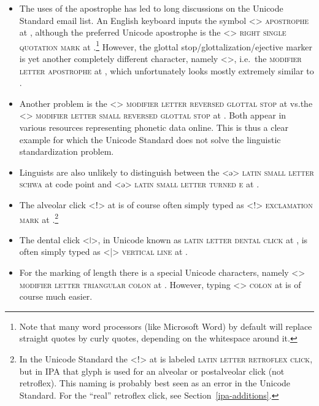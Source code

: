 \begin{itemize}

  \item The uses of the apostrophe has led to long discussions on the Unicode
        Standard email list. An English keyboard inputs the symbol
        <> \textsc{apostrophe} at , although the preferred Unicode
        apostrophe is the <> \textsc{right single quotation mark} at
        .\footnote{Note that many word processors (like Microsoft
        Word) by default will replace straight quotes by curly quotes,
        depending on the whitespace around it.} However, the glottal
        stop/glottalization/ejective marker is yet another completely different
        character, namely <>, i.e.~the \textsc{modifier letter apostrophe} 
        at , which unfortunately looks mostly extremely similar to
        . 
  \item Another problem is the <> \textsc{modifier letter reversed glottal
        stop} at  vs.\@ the <> \textsc{modifier letter small reversed
        glottal stop} at . Both appear in various resources
        representing phonetic data online. This is thus a clear example for
        which the Unicode Standard does not solve the linguistic standardization
        problem.
  \item Linguists are also unlikely to distinguish between the <ə>
        \textsc{latin small letter schwa} at code point  and <ǝ>
        \textsc{latin small letter turned e} at .
  \item The alveolar click <ǃ> at  is of course often simply
        typed as <!> \textsc{exclamation mark} at .\footnote{In the
        Unicode Standard the <ǃ> at  is labeled \textsc{latin letter
        retroflex click}, but in IPA that glyph is used for an alveolar or
        postalveolar click (not retroflex). This naming is probably best seen as
        an error in the Unicode Standard. For the ``real'' retroflex click, see 
        Section~\ref{ipa-additions}.}
  \item The dental click <ǀ>, in Unicode known as \textsc{latin letter dental
        click} at , is often simply typed as <|> \textsc{vertical
        line} at .
  \item For the marking of length there is a special Unicode characters, namely
        <> \textsc{modifier letter triangular colon} at . However,
        typing <> \textsc{colon} at  is of course much easier.        
  
\end{itemize} 


